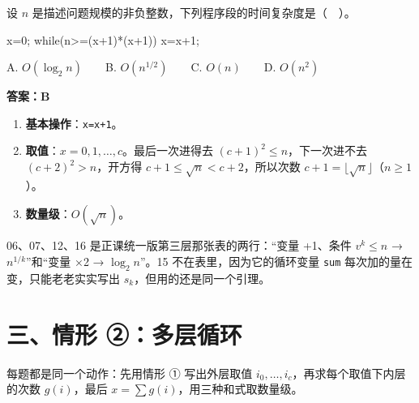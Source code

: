 \documentclass[10.5pt,a4paper,oneside]{article}
\newcommand{\hlred}[1]{\textcolor{wdred}{\bfseries #1}}
\providecommand{\tightlist}{\setlength{\itemsep}{2pt}\setlength{\parskip}{0pt}}
\newcommand{\tocback}{\par\vspace{-3pt}{\hfill\footnotesize\hyperlink{toc}{\textcolor{wdgray}{\ensuremath{\uparrow}\,回到目录}}}\par\vspace{-4pt}}
\newenvironment{Shaded}{}{}
\newcommand{\ControlFlowTok}[1]{\textcolor[rgb]{0.12,0.31,0.71}{#1}}
\newcommand{\DecValTok}[1]{\textcolor[rgb]{0.77,0.35,0.07}{#1}}
\newcommand{\NormalTok}[1]{#1}
\newcommand{\OperatorTok}[1]{\textcolor[rgb]{0.20,0.20,0.20}{#1}}
\begin{document}
\begin{questionbox}[16 · 2019 统考真题]

设 \(n\) 是描述问题规模的非负整数，下列程序段的时间复杂度是（　）。

\begin{Shaded}
\begin{Highlighting}[]
\NormalTok{x}\OperatorTok{=}\DecValTok{0}\OperatorTok{;}
\ControlFlowTok{while}\OperatorTok{(}\NormalTok{n}\OperatorTok{\textgreater{}=(}\NormalTok{x}\OperatorTok{+}\DecValTok{1}\OperatorTok{)*(}\NormalTok{x}\OperatorTok{+}\DecValTok{1}\OperatorTok{))}
\NormalTok{    x}\OperatorTok{=}\NormalTok{x}\OperatorTok{+}\DecValTok{1}\OperatorTok{;}
\end{Highlighting}
\end{Shaded}

A. \(O(\log_2 n)\)　　B. \(O(n^{1/2})\)　　C. \(O(n)\)　　D. \(O(n^2)\)

\end{questionbox}

\hlred{\textbf{答案：B}}

\begin{enumerate}
\def\labelenumi{\arabic{enumi}.}
\tightlist
\item
  \textbf{基本操作}：\texttt{x=x+1}。
\item
  \textbf{取值}：\(x=0,1,\dots,c\)。最后一次进得去
  \((c+1)^2\le n\)，下一次进不去 \((c+2)^2>n\)，开方得
  \(c+1\le\sqrt n<c+2\)，所以次数
  \(c+1=\lfloor\sqrt n\rfloor\)（\(n\ge1\)）。
\item
  \textbf{数量级}：\(O(\sqrt n)\)。
\end{enumerate}

\begin{addbox}

06、07、12、16 是正课统一版第三层那张表的两行：“变量 +1、条件
\(v^k\le n\) → \(n^{1/k}\)”和“变量 ×2 → \(\log_2 n\)”。15
不在表里，因为它的循环变量 \texttt{sum} 每次加的量在变，只能老老实实写出
\(s_k\)，但用的还是同一个引理。

\end{addbox}

\hypertarget{ux4e09ux60c5ux5f62-ux2461ux591aux5c42ux5faaux73af}{%
\section{三、情形
②：多层循环}\label{ux4e09ux60c5ux5f62-ux2461ux591aux5c42ux5faaux73af}}

\tocback

每题都是同一个动作：先用情形 ① 写出外层取值
\(i_0,\dots,i_c\)，再求每个取值下内层的次数 \(g(i)\)，最后
\(x=\sum g(i)\)，用三种和式取数量级。
\end{document}
